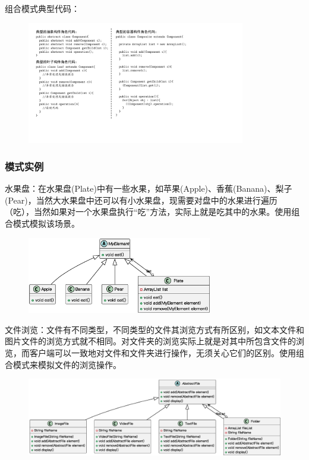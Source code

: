 组合模式典型代码：
\begin{figure}[H]
    \vspace{-0.5em}
	\centering
	\includegraphics[width=0.85\textwidth]{images/组合模式典型代码.pdf}
    \vspace{-1em}
\end{figure}

\subsubsection{模式实例}
水果盘：在水果盘(Plate)中有一些水果，如苹果(Apple)、香蕉(Banana)、梨子(Pear)，当然大水果盘中还可以有小水果盘，现需要对盘中的水果进行遍历（吃），当然如果对一个水果盘执行“吃”方法，实际上就是吃其中的水果。使用组合模式模拟该场景。
\begin{figure}[H]
    \vspace{-0.5em}
	\centering
	\includegraphics[width=0.72\textwidth]{images/组合模式实例1.eps}
    \vspace{-1em}
\end{figure}

文件浏览：文件有不同类型，不同类型的文件其浏览方式有所区别，如文本文件和图片文件的浏览方式就不相同。对文件夹的浏览实际上就是对其中所包含文件的浏览，而客户端可以一致地对文件和文件夹进行操作，无须关心它们的区别。使用组合模式来模拟文件的浏览操作。
\begin{figure}[H]
    \vspace{-0.5em}
	\centering
	\includegraphics[width=\textwidth]{images/组合模式实例2.eps}
    \vspace{-1em}
\end{figure}

